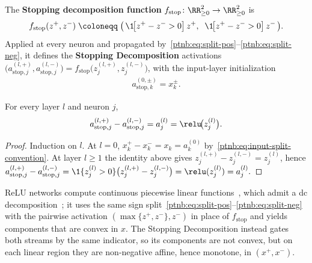 The \textbf{Stopping decomposition function} $f_{\mathrm{stop}} \colon \RR_{\ge 0}^2 \to \RR_{\ge
    0}^2$ is
\begin{align}\label{ptnb:eq:stop-relu}
    f_{\mathrm{stop}}(z^+, z^-) \;\coloneqq\; \bigl(\,\1\!\bigl[z^+ - z^- > 0\bigr]\, z^+,\;\;
    \1\!\bigl[z^+ - z^- > 0\bigr]\, z^-\,\bigr).
\end{align}
Applied at every neuron and propagated by~\eqref{ptnb:eq:split-pos}--\eqref{ptnb:eq:split-neg}, it defines
the \textbf{Stopping Decomposition} activations $\bigl(a_{\mathrm{stop},j}^{(l,+)},
    a_{\mathrm{stop},j}^{(l,-)}\bigr) = f_{\mathrm{stop}}\bigl(z_j^{(l,+)}, z_j^{(l,-)}\bigr)$, with
the input-layer initialization
\begin{align}\label{ptnb:eq:input-split-convention}
    a_{\mathrm{stop},k}^{(0,\pm)} = x_k^{\pm}.
\end{align}

\begin{theoremenv}\label{ptnb:thm:decomp-recovery}
For every layer $l$ and neuron $j$,
\begin{align}\label{ptnb:eq:decomp-recovery-stop-mix}
    a_{\mathrm{stop},j}^{(l,+)} - a_{\mathrm{stop},j}^{(l,-)}
    =
    a_j^{(l)} = \relu\!\bigl(z_j^{(l)}\bigr).
\end{align}
\hfill{}
\end{theoremenv}

\begin{proof}
Induction on $l$. At $l=0$, $x_k^+ - x_k^- = x_k = a_k^{(0)}$ by~\eqref{ptnb:eq:input-split-convention}.
At layer $l \ge 1$ the identity above gives $z_j^{(l,+)} - z_j^{(l,-)} = z_j^{(l)}$, hence
\(
    a_{\mathrm{stop},j}^{(l,+)} - a_{\mathrm{stop},j}^{(l,-)}
    = \1\{z_j^{(l)} > 0\}\bigl(z_j^{(l,+)} - z_j^{(l,-)}\bigr)
    = \relu(z_j^{(l)})
    = a_j^{(l)}.
\)
\end{proof}

ReLU networks compute continuous piecewise linear functions~\parencite{Arora2018}, which
admit a \ac{dc} decomposition~\parencite{hiddenMono}; it uses the same sign
split~\eqref{ptnb:eq:split-pos}--\eqref{ptnb:eq:split-neg} with the pairwise activation $(\max\{z^+, z^-\},
    z^-)$ in place of $f_{\mathrm{stop}}$ and yields components that are convex in $x$. The Stopping
Decomposition instead gates both streams by the same indicator, so its components are not convex,
but on each linear region they are non-negative affine, hence monotone, in $(x^+, x^-)$.

